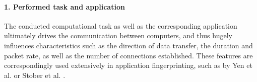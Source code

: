 \documentclass[runningheads]{llncs}
\begin{document}


 
\paragraph{1. Performed task and application}
The conducted computational task as well as the corresponding application ultimately drives the communication between computers, and thus hugely influences characteristics such as the direction of data transfer, the duration and packet rate, as well as the number of connections established. These features are correspondingly used extensively in application fingerprinting, such as by Yen et al. \cite{yen2009browser} or Stober et al. \cite{stober2013you}. %
\end{document}
